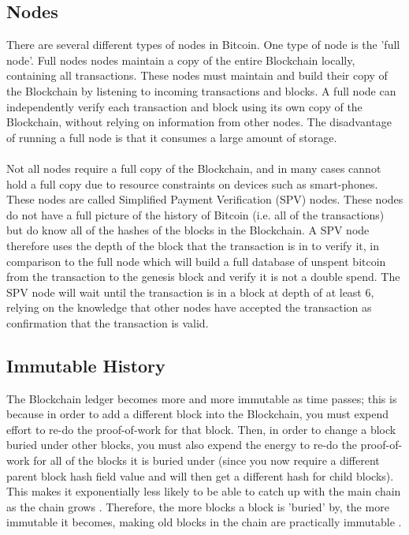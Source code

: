 \subsection{Nodes}\label{background-nodes}
There are several different types of nodes in Bitcoin. One type of node is the 'full node'. Full nodes nodes maintain a copy of the entire Blockchain locally, containing all transactions. These nodes must maintain and build their copy of the Blockchain by listening to incoming transactions and blocks. A full node can independently verify each transaction and block using its own copy of the Blockchain, without relying on information from other nodes. The disadvantage of running a full node is that it consumes a large amount of storage. 
\\\\
Not all nodes require a full copy of the Blockchain, and in many cases cannot hold a full copy due to resource constraints on devices such as smart-phones. These nodes are called Simplified Payment Verification (SPV)\cite{RefWorks:doc:5c39e80ae4b0854ae611b047} nodes. These nodes do not have a full picture of the history of Bitcoin (i.e. all of the transactions) but do know all of the hashes of the blocks in the Blockchain. A SPV node therefore uses the depth of the block that the transaction is in to verify it, in comparison to the full node which will build a full database of unspent bitcoin from the transaction to the genesis block and verify it is not a double spend. The SPV node will wait until the transaction is in a block at depth of at least 6, relying on the knowledge that other nodes have accepted the transaction as confirmation that the transaction is valid. 

\subsection{Immutable History}
The Blockchain ledger becomes more and more immutable as time passes; this is because in order to add a different block into the Blockchain, you must expend effort to re-do the proof-of-work for that block. Then, in order to change a block buried under other blocks, you must also expend the energy to re-do the proof-of-work for all of the blocks it is buried under (since you now require a different parent block hash field value and will then get a different hash for child blocks). This makes it exponentially less likely to be able to catch up with the main chain as the chain grows \cite{RefWorks:doc:5c3b547fe4b0613d0cda0434}. Therefore, the more blocks a block is 'buried' by, the more immutable it becomes, making old blocks in the chain are practically immutable \cite{RefWorks:doc:5c39e80ae4b0854ae611b047}. 

